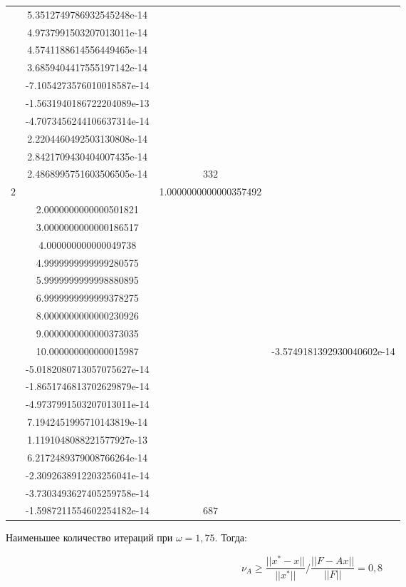 \documentclass[oneside, final, 12pt]{extarticle}
\begin{document}
\begin{longtable}{|c|c|c|c|}
\(\begin{aligned} & 5.3512749786932545248e-14 \\ & 4.9737991503207013011e-14 \\ & 4.5741188614556449465e-14 \\ & 3.6859404417555197142e-14 \\ & -7.1054273576010018587e-14 \\ & -1.5631940186722204089e-13 \\ & -4.7073456244106637314e-14 \\ & 2.2204460492503130808e-14 \\ & 2.8421709430404007435e-14 \\ & 2.4868995751603506505e-14 \end{aligned}\) &
\(332\) \\ \hline
\(2\) &
\(\begin{aligned} & 1.0000000000000357492 \\ & 2.0000000000000501821 \\ & 3.0000000000000186517 \\ & 4.000000000000049738 \\ & 4.9999999999999280575 \\ & 5.9999999999998880895 \\ & 6.9999999999999378275 \\ & 8.0000000000000230926 \\ & 9.0000000000000373035 \\ & 10.000000000000015987 \end{aligned}\) &
\(\begin{aligned} & -3.5749181392930040602e-14 \\ & -5.0182080713057075627e-14 \\ & -1.8651746813702629879e-14 \\ & -4.9737991503207013011e-14 \\ & 7.1942451995710143819e-14 \\ & 1.1191048088221577927e-13 \\ & 6.2172489379008766264e-14 \\ & -2.3092638912203256041e-14 \\ & -3.7303493627405259758e-14 \\ & -1.5987211554602254182e-14 \end{aligned}\) &
\(687\) \\ \hline
\end{longtable}

Наименьшее количество итераций при \(\omega = 1,75\). Тогда:

\[\nu_A \geqslant \frac{||x^*-x||}{||x^*||} / \frac{||F-Ax||}{||F||} = 0,8\]
\end{document}
